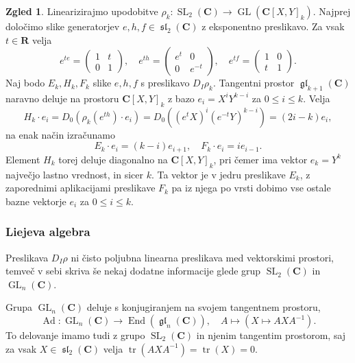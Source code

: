 \documentclass[11pt]{book}
\def\RR{\mathbf{R}}
\def\CC{\mathbf{C}}
\DeclareMathOperator\tr{tr}
\DeclareMathOperator\GL{GL}
\DeclareMathOperator\glfrak{\mathfrak{gl}}
\DeclareMathOperator\slfrak{\mathfrak{sl}}
\DeclareMathOperator\SL{SL}
\DeclareMathOperator\End{End}
\DeclareMathOperator\Ad{Ad}
\theoremstyle{definition}
\theoremstyle{zgled}
\newtheorem*{zgled}{Zgled}
\theoremstyle{odprtproblem}
\theoremstyle{domacanaloga}
\theoremstyle{izrek}
\begin{document}
\begin{zgled}
Linearizirajmo upodobitve $\rho_k \colon \SL_2(\CC) \to \GL(\CC[X,Y]_k)$. Najprej določimo slike generatorjev $e,h,f \in \slfrak_2(\CC)$ z eksponentno preslikavo. Za vsak $t \in \RR$ velja
\[
    e^{te} = \begin{pmatrix}
        1 & t \\ 0 & 1
    \end{pmatrix}, \quad
    e^{th} = \begin{pmatrix}
        e^t & 0 \\ 0 & e^{-t}
    \end{pmatrix}, \quad
    e^{tf} = \begin{pmatrix}
        1 & 0 \\ t & 1
    \end{pmatrix}.
\]
Naj bodo $E_k, H_k, F_k$ slike $e,h,f$ s preslikavo $D_I \rho_k$. Tangentni prostor $\glfrak_{k+1}(\CC)$ naravno deluje na prostoru $\CC[X,Y]_k$ z bazo $e_i = X^i Y^{k-i}$ za $0 \leq i \leq k$. Velja
\[
    H_k \cdot e_i
    = D_0 \left( \rho_k(e^{th}) \cdot e_i \right)
    = D_0 \left( (e^t X)^i (e^{-t} Y)^{k-i} \right)
    = (2i - k) e_i,
\]
na enak način izračunamo
\[
    E_k \cdot e_i = (k-i) e_{i+1}, \quad
    F_k \cdot e_i = i e_{i-1}.
\]
Element $H_k$ torej deluje diagonalno na $\CC[X,Y]_k$, pri čemer ima vektor $e_k = Y^k$ največjo lastno vrednost, in sicer $k$. Ta vektor je v jedru preslikave $E_k$, z zaporednimi aplikacijami preslikave $F_k$ pa iz njega po vrsti dobimo vse ostale bazne vektorje $e_i$ za $0 \leq i \leq k$.
\end{zgled}

\subsubsection{Liejeva algebra}

Preslikava $D_I \rho$ ni čisto poljubna linearna preslikava med vektorskimi prostori, temveč v sebi skriva še nekaj dodatne informacije glede grup $\SL_2(\CC)$ in $\GL_n(\CC)$.

Grupa $\GL_n(\CC)$ deluje s konjugiranjem na svojem tangentnem prostoru,
\[
    \textstyle \Ad \colon \GL_n(\CC) \to \End(\glfrak_n(\CC)), \quad
    A \mapsto \left( X \mapsto A X A^{-1} \right).
\]
To delovanje imamo tudi z grupo $\SL_2(\CC)$ in njenim tangentim prostorom, saj za vsak $X \in \slfrak_2(\CC)$ velja $\tr(AXA^{-1}) = \tr(X) = 0$.
\end{document}
